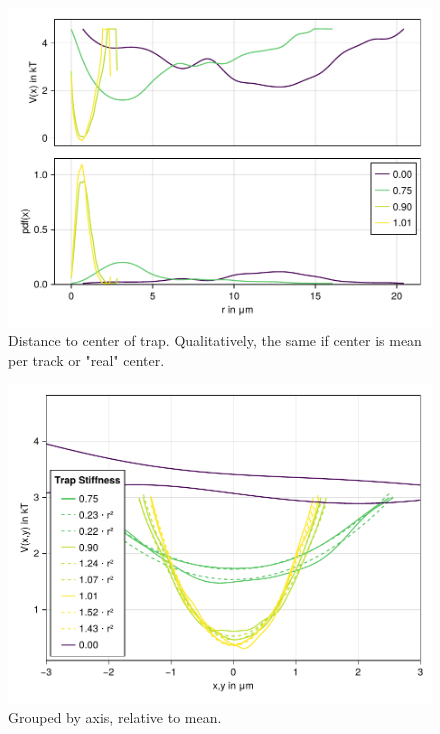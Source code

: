\documentclass[
    parskip=half, 
    twoside=false,
    twocolumn=true,
    fontsize=11pt,
]{scrarticle}
\begin{document}
\begin{figure}[h]
    \centering
    \includegraphics{figures/01_03_2_radial.pdf}
    \caption{Distance to center of trap. Qualitatively, the same if center is mean per track or "real" center.}
\end{figure}

\begin{figure}[h]
    \centering
    \includegraphics{figures/01_03_3_axis.pdf}
    \caption{Grouped by axis, relative to mean.}
\end{figure}
\end{document}
